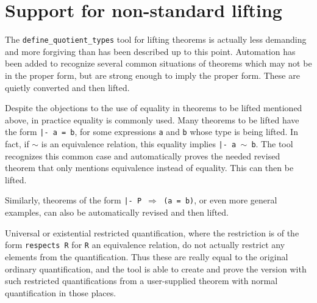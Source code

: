 \documentclass[envcountsame,runningheads]{llncs}
\begin{document}
\begin{comment}
Generally, any mention of equality between elements of a type being
lifted will make a theorem not liftable.  A variant of the theorem
should be proven which substitutes equivalence for the equality.
%
This should really not be surprising, since the purpose of collapsing
equivalence classes into single entities is meant to render the results
indistinguishable.  Therefore properties which rely on those distinctions
will not translate to the higher level, which in particular excludes
the equality relation between values which are now being declared as
equivalent.

\end{comment}


%
\section{Support for non-standard lifting}
%
\label{nonstandard}

The {\tt define\_quotient\_types} tool
for lifting theorems is actually less
demanding and more forgiving than has been described up to this point.
Automation has been added to recognize several common
situations of theorems which may not be in the proper form, but are
strong enough to imply the proper form.  These are quietly converted
and then lifted.

Despite the objections to the use of equality
in theorems to be lifted mentioned above, in practice equality is commonly used.
Many theorems to be lifted have the form 
{\tt |- a = b}, for some expressions {\tt a} and {\tt b} whose type is
being lifted. 
In fact,
if $\sim$ is an equivalence relation,
this equality implies {\tt |- a $\sim$ b}.
The tool recognizes this common case and automatically proves
the needed revised
theorem that only mentions equivalence instead of equality. 
This can then be lifted. 

Similarly, theorems of the form {\tt |- P $\Rightarrow$ (a = b)}, or even more
general examples, can also be
automatically revised and then lifted. 

Universal or existential restricted quantification, where the 
restriction is of the form {\tt respects R} for {\tt R} an equivalence
relation, do not actually restrict any elements from the quantification.
Thus these are really equal to the original ordinary quantification,
and the tool is able to create and prove the version with such
restricted quantifications from a user-supplied theorem with normal
quantification in those places.
\end{document}
